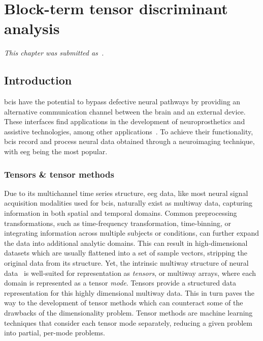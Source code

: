
\chapter{Block-term tensor discriminant analysis}
\label{sec:bttda}

\emph{This chapter was submitted as~\textcite{VanDenKerchove2024a}.}

\section{Introduction}

\Acp{bci} have the potential to bypass
defective neural pathways by providing an alternative communication channel
between the brain and an external device.
These interfaces find applications in the development of neuroprosthetics and assistive
technologies, among other applications~\cite{Wolpaw2020}.
To achieve their functionality, \acp{bci} record and process neural data obtained through
a neuroimaging technique, with \ac{eeg} being the most popular.

\subsection{Tensors \& tensor methods}

Due to its multichannel time series structure, \ac{eeg} data, like most neural
signal acquisition modalities used for \acp{bci}, naturally exist as multiway data,
capturing information in both spatial and temporal domains.
Common preprocessing transformations, such as time-frequency transformation,
time-binning, or integrating information across multiple subjects or conditions,
can further expand the data into additional analytic domains.
This can result in high-dimensional datasets which are usually flattened into a
set of sample vectors, stripping the original data from its structure.
Yet, the intrinsic multiway structure of neural data~\cite{Erol2022} is
well-suited for representation as \emph{tensors}, or multiway arrays, where
each domain is represented as a tensor \emph{mode}.
Tensors provide a structured data representation for this highly dimensional
multiway data.
This in turn paves the way to the development of tensor methods which can
counteract some of the drawbacks of the dimensionality problem.
Tensor methods are machine learning techniques that consider each tensor mode
separately, reducing a given problem into partial, per-mode problems.

